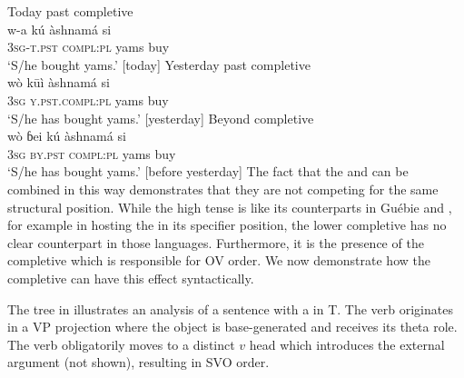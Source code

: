 \documentclass[output=paper,newtxmath,modfonts,nonflat,draftmode]{langsci/langscibook}
\begin{document}
\ea \label{ex:14:gwari}
\ea \label{ex:14a:gwari} {Today past completive}	\\
\gll w-a kú àshnamá si  \\
3\textsc{sg}-\textsc{t.pst} \textsc{compl:pl} yams buy \\
\glt `S/he bought yams.' [today] \hfill \citep[][57]{hyman1970}
\ex \label{ex:14b:gwari} {Yesterday past completive}	\\
\gll wò  k\=uì àshnamá si  \\
3\textsc{sg} \textsc{y.pst}.\textsc{compl:pl} yams buy \\
\glt `S/he has bought yams.' [yesterday] \hfill \citep[][57]{hyman1970}
\ex \label{ex:14c:gwari}{Beyond  completive}	\\
\gll wò {ɓei} kú àshnamá si  \\
3\textsc{sg} \textsc{by.pst} \textsc{compl:pl} yams buy \\
\glt `S/he has bought yams.' [before yesterday] \hfill \citep[][57]{hyman1970}
\z
\z
The fact that the  and  can be combined in this way demonstrates that they are not competing for the same structural position. While the high tense  is like its  counterparts in Guébie and , for example in hosting the  in its specifier position, the lower completive  has no clear counterpart in those languages. Furthermore, it is the presence of the completive which is responsible for OV order. We now demonstrate how the completive can have this effect syntactically.

The tree in  illustrates an analysis of a  sentence with a   in T. The verb originates in a VP projection where the object is base-generated and receives its theta role. The verb obligatorily moves to a distinct $v$ head which introduces the external argument (not shown), resulting in SVO order.
\end{document}
